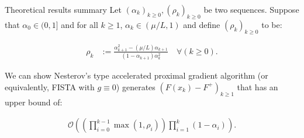 \documentclass[11pt]{beamer}
\theoremstyle{definition}
\begin{document}
        \begin{frame}{Theoretical results summary}
            Let $(\alpha_k)_{k \ge0}, (\rho_k)_{k \ge 0}$ be two sequences. 
            Suppose that $\alpha_0 \in (0, 1]$ and for all $k \ge 1$, $\alpha_k \in (\mu/L, 1)$ and define $(\rho_k)_{k\ge0 }$ to be: 
            \begin{tcolorbox}\noindent\vspace{-1em}
                \begin{align*}
                    \rho_k &:= \frac{\alpha_{k + 1}^2 - (\mu/L)\alpha_{k + 1}}{(1 - \alpha_{k + 1})\alpha_k^2} \quad \forall (k \ge 0).
                \end{align*}
            \end{tcolorbox}
            We can show Nesterov's type accelerated proximal gradient algorithm (or equivalently, FISTA with $g \equiv 0$) generates $(F(x_k) - F^+)_{k\ge 1}$ that has an upper bound of: 
            \begin{tcolorbox}\noindent\vspace{-1em} 
                \begin{align*}
                    \mathcal O\left(
                        \left(
                            \prod_{i = 0}^{k - 1} \max(1, \rho_{i})
                        \right)
                        \prod_{i = 1}^{k} \left(1  - \alpha_i\right)
                    \right).
                \end{align*}
            \end{tcolorbox}
        \end{frame}
\end{document}
